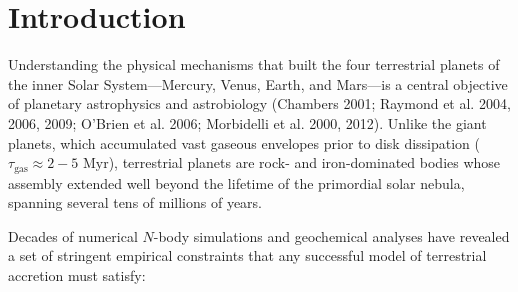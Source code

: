 \documentclass[11pt,a4paper]{article}
\begin{document}
\section{Introduction}
Understanding the physical mechanisms that built the four terrestrial planets of the inner Solar System---Mercury, Venus, Earth, and Mars---is a central objective of planetary astrophysics and astrobiology (Chambers 2001; Raymond et al. 2004, 2006, 2009; O'Brien et al. 2006; Morbidelli et al. 2000, 2012). Unlike the giant planets, which accumulated vast gaseous envelopes prior to disk dissipation ($\tau_{\text{gas}} \approx 2-5\text{ Myr}$), terrestrial planets are rock- and iron-dominated bodies whose assembly extended well beyond the lifetime of the primordial solar nebula, spanning several tens of millions of years.

Decades of numerical $N$-body simulations and geochemical analyses have revealed a set of stringent empirical constraints that any successful model of terrestrial accretion must satisfy:
\end{document}

